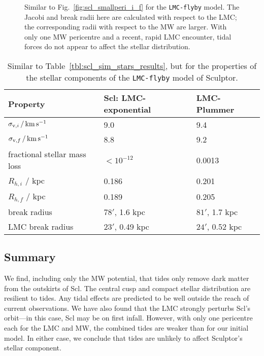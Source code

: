 \begin{figure}
\centering
{}
\caption[Sculptor initial and final density with LMC]{Similar to
Fig.~\ref{fig:scl_smallperi_i_f} for the \texttt{LMC-flyby} model. The
Jacobi and break radii here are calculated with respect to the LMC; the
corresponding radii with respect to the MW are larger. With only one MW
pericentre and a recent, rapid LMC encounter, tidal forces do not appear
to affect the stellar distribution.}\label{fig:scl_lmc_i_f}
\end{figure}

\begin{table*}[t]
\centering
\caption[Simulation results for Sculptor’s stars in the MW+LMC potential]{Similar to Table \ref{tbl:scl_sim_stars_results}, but for the properties of the stellar components of the \texttt{LMC-flyby} model of Sculptor. }
\label{tbl:scl_lmc_sim_stars}
\begin{tabular}{lll}
\toprule
Property & Scl: LMC-exponential & LMC-Plummer\\
\midrule
$\sigma_{{\rm v}, i}\,/\,{\rm km\,s^{-1}}$ & 9.0 & 9.4\\
$\sigma_{{\rm v}, f} \,/\,{\rm km\,s^{-1}}$ & 8.8 & 9.2\\
fractional stellar mass loss & $<10^{-12}$ & 0.0013\\
$R_{h, i}$ / kpc & 0.186 & 0.201\\
$R_{h, f}$ / kpc & 0.189 & 0.205\\
break radius & $78'$, 1.6 kpc & $81'$, 1.7 kpc\\
LMC break radius & $23'$, 0.49 kpc & $24'$, 0.52 kpc\\
\bottomrule
\end{tabular}
\end{table*}

\subsection{Summary}\label{summary}

We find, including only the MW potential, that tides only remove dark
matter from the outskirts of Scl. The central cusp and compact stellar
distribution are resilient to tides. Any tidal effects are predicted to
be well outside the reach of current observations. We have also found
that the LMC strongly perturbs Scl's orbit---in this case, Scl may be on
first infall. However, with only one pericentre each for the LMC and MW,
the combined tides are weaker than for our initial model. In either
case, we conclude that tides are unlikely to affect Sculptor's stellar
component.

